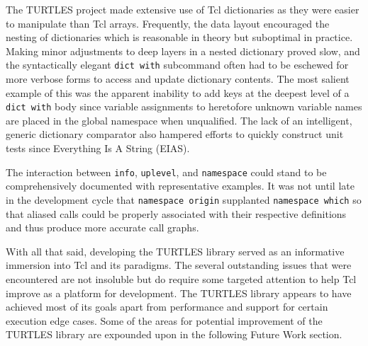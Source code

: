 \documentclass{article}[letter,10pt]
\begin{document}
{  The TURTLES project made extensive use of Tcl dictionaries as they were easier to manipulate than Tcl arrays. Frequently,
  the data layout encouraged the nesting of dictionaries which is reasonable in theory but suboptimal in practice. Making minor
  adjustments to deep layers in a nested dictionary proved slow, and the syntactically elegant \texttt{dict with} subcommand
  often had to be eschewed for more verbose forms to access and update dictionary contents. The most salient example of this
  was the apparent inability to add keys at the deepest level of a \texttt{dict with} body since variable assignments to
  heretofore unknown variable names are placed in the global namespace when unqualified. The lack of an intelligent, generic dictionary
  comparator also hampered efforts to quickly construct unit tests since Everything Is A String (EIAS).

  The interaction between \texttt{info}, \texttt{uplevel}, and \texttt{namespace} could stand to be comprehensively documented
  with representative examples. It was not until late in the development cycle that \texttt{namespace origin} supplanted \texttt{namespace which}
  so that aliased calls could be properly associated with their respective definitions and thus produce more accurate call graphs.

  With all that said, developing the TURTLES library served as an informative immersion into Tcl and its paradigms. The several outstanding
  issues that were encountered are not insoluble but do require some targeted attention to help Tcl improve as a platform for development.
  The TURTLES library appears to have achieved most of its goals apart from performance and support for certain execution edge cases.
  Some of the areas for potential improvement of the TURTLES library are expounded upon in the following Future Work section.
}
\end{document}
